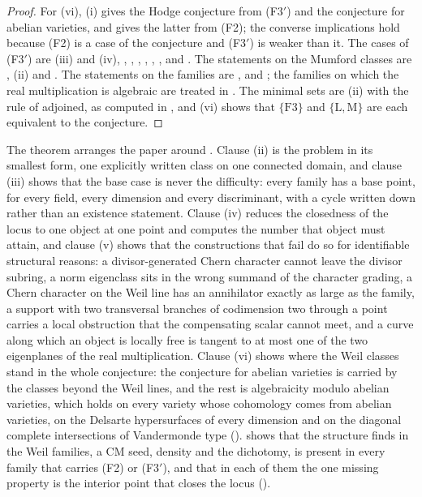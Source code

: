 \documentclass[11pt,reqno]{amsart}
\theoremstyle{plain}
\theoremstyle{definition}
\theoremstyle{remark}
\begin{document}
\begin{proof}
For (vi), (i) gives the Hodge conjecture from
\textup{(F3$'$)} and the conjecture for abelian varieties, and
 gives the latter from \textup{(F2)}; the converse
implications hold because \textup{(F2)} is a case of the conjecture and
\textup{(F3$'$)} is weaker than it. The cases of \textup{(F3$'$)} are
(iii) and (iv), ,
, ,
, ,
,  and .
The statements on
the Mumford classes are , (ii) and
. The statements on the families are
,  and ; the
families on which the real multiplication is algebraic are treated in
\cite{BB26dense}. The
minimal sets are (ii) with
the rule of  adjoined, as computed in ,
and (vi) shows that $\{\mathrm{F3}\}$ and
$\{\mathrm{L},\mathrm{M}\}$ are each equivalent to the conjecture.
\end{proof}

The theorem arranges the paper around \cite[Theorem~1.1]{paperI}. Clause (ii) is the
problem in its smallest form, one explicitly written class on one connected
domain, and clause (iii) shows that the base case is never the difficulty:
every family has a base point, for every field, every dimension and every
discriminant, with a cycle written down rather than an existence statement.
Clause (iv) reduces the closedness of the locus to one object at one point
and computes the number that object must attain, and clause (v) shows that
the constructions that fail do so for identifiable structural reasons: a
divisor-generated Chern character cannot leave the divisor subring, a norm
eigenclass sits in the wrong summand of the character grading, a Chern
character on the Weil line has an annihilator exactly as large as the family,
a support with two transversal branches of codimension two through a point
carries a local obstruction that the compensating scalar cannot meet, and a curve along which an object is locally
free is tangent to at most one of the two eigenplanes of the real
multiplication. Clause (vi) shows where the Weil classes stand in the whole
conjecture: the conjecture for abelian varieties is carried by the classes
beyond the Weil lines, and the rest is algebraicity modulo abelian varieties,
which holds on every variety whose cohomology comes from abelian varieties,
on the Delsarte hypersurfaces of every dimension and on the diagonal
complete intersections of Vandermonde type ().
 shows that the structure \cite[Theorem~1.1]{paperI} finds in the
Weil families, a CM seed, density and the dichotomy, is present in every
family that carries (F2) or \textup{(F3$'$)}, and that in each of them the
one missing property is the interior point that closes the locus
().
\end{document}
